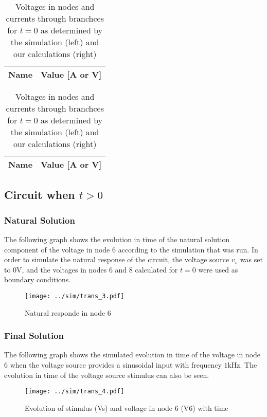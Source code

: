 \begin{table}[H]
  \centering
  \begin{tabular}{|c|c|}
    \hline    
    {\bf Name} & {\bf Value [A or V]} \\ \hline
    
  \end{tabular}
  \begin{tabular}{|c|c|}
    \hline    
    {\bf Name} & {\bf Value [A or V]} \\ \hline
    
  \end{tabular}
  \caption{Voltages in nodes and currents through branchces for $t=0$ as determined by the simulation (left) and our calculations (right)}
  \label{tab:comparison2}
\end{table}


\subsection{Circuit when $t>0$}

\subsubsection{Natural Solution}

The following graph shows the evolution in time of the natural solution component of the voltage in node 6 according to the simulation that was run. In order to simulate the natural response of the circuit, the voltage source $v_s$ was set to $0$V, and the voltages in nodes 6 and 8 calculated for $t=0$ were used as boundary conditions.

\begin{figure}[H] \centering
\texttt{[image: ../sim/trans\_3.pdf]}
\caption{Natural responde in node 6}
\label{fig:natural_sim}
\end{figure}

\subsubsection{Final Solution}

The following graph shows the simulated evolution in time of the voltage in node 6 when the voltage source provides a sinusoidal input with frequency $1$kHz. The evolution in time of the voltage source stimulus can also be seen.

\begin{figure}[H] \centering
\texttt{[image: ../sim/trans\_4.pdf]}
\caption{Evolution of stimulus (Vs) and voltage in node 6 (V6) with time}
\label{fig:final_sim}
\end{figure}

